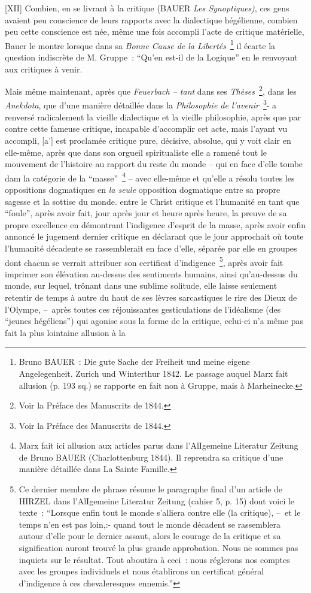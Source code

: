 \documentclass[french,twoside]{book} %
\begin{document}
[XII] Combien, en se livrant à la critique (BAUER \emph{Les Synoptiques)}, ces gens avaient peu conscience de leurs rapports avec la dialectique hégélienne, combien peu cette conscience est née, même une fois accompli l’acte de critique matérielle, Bauer le montre lorsque dans sa \emph{Bonne Cause de la Libertés} \footnote{Bruno BAUER : Die gute Sache der Freiheit und meine eigene Angelegenheit. Zurich und Winterthur 1842. Le passage auquel Marx fait allusion (p. 193 sq.) se rapporte en fait non à Gruppe, mais à Marheinecke.} il écarte la question indiscrète de M. Gruppe : “Qu’en est-il de la Logique” en le renvoyant aux critiques à venir.\par
Mais même maintenant, après que \emph{Feuerbach – tant} dans ses \emph{Thèses} \footnote{Voir la Préface des Manuscrits de 1844.}, dans les \emph{Anekdota}, que d’une manière détaillée dans la \emph{Philosophie de l’avenir} \footnote{Voir la Préface des Manuscrits de 1844.}- a renversé radicalement la vieille dialectique et la vieille philosophie, après que par contre cette fameuse critique, incapable d’accomplir cet acte, mais l’ayant vu accompli, [a'] est proclamée critique pure, décisive, absolue, qui y voit clair en elle-même, après que dans son orgueil spiritualiste elle a ramené tout le mouvement de l’histoire au rapport du reste du monde – qui en face d’elle tombe dam la catégorie de la “masse” \footnote{Marx fait ici allusion aux articles parus dans l’AlIgemeine Literatur Zeitung de Bruno BAUER (Charlottenburg 1844). Il reprendra sa critique d’une manière détaillée dans La Sainte Famille.} – avec elle-même et qu’elle a résolu toutes les oppositions dogmatiques en \emph{la seule} opposition dogmatique entre sa propre sagesse et la sottise du monde. entre le Christ critique et l’humanité en tant que “foule”, après avoir fait, jour après jour et heure après heure, la preuve de sa propre excellence en démontrant l’indigence d’esprit de la masse, après avoir enfin annoncé le jugement dernier critique en déclarant que le jour approchait où toute l’humanité décadente se rassemblerait en face d’elle, séparée par elle en groupes dont chacun se verrait attribuer son certificat d’indigence \footnote{Ce dernier membre de phrase résume le paragraphe final d’un article de HIRZEL dans l’AlIgemeine Literatur Zeitung (cahier 5, p. 15) dont voici le texte : “Lorsque enfin tout le monde s’alliera contre elle (la critique), – et le temps n’en est pas loin,:- quand tout le monde décadent se rassemblera autour d’elle pour le dernier assaut, alors le courage de la critique et sa signification auront trouvé la plus grande approbation. Nous ne sommes pas inquiets sur le résultat. Tout aboutira à ceci : nous réglerons nos comptes avec les groupes individuels et nous établirons un certificat général d’indigence à ces chevaleresques ennemis.”}, après avoir fait imprimer son élévation au-dessus des sentiments humains, ainsi qu’au-dessus du monde, sur lequel, trônant dans une sublime solitude, elle laisse seulement retentir de temps à autre du haut de ses lèvres sarcastiques le rire des Dieux de l’Olympe, – après toutes ces réjouissantes gesticulations de l’idéalisme (des “jeunes hégéliens”) qui agonise sous la forme de la critique, celui-ci n’a même pas fait la plus lointaine allusion à la 
\end{document}
